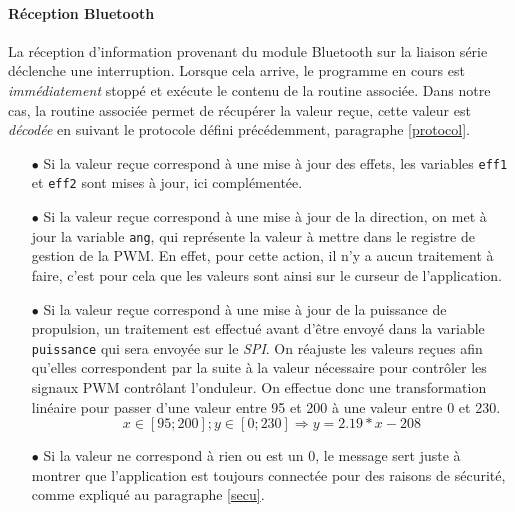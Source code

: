 			\paragraph{Réception Bluetooth} La réception d'information provenant du module Bluetooth sur la liaison série déclenche une interruption. Lorsque cela arrive, le programme en cours est \textit{immédiatement} stoppé et exécute le contenu de la routine associée. Dans notre cas, la routine associée permet de récupérer la valeur reçue, cette valeur est \textit{décodée} en suivant le protocole défini précédemment, paragraphe \ref{protocol}.
			\begin{itemize}
			\item[$\bullet$] Si la valeur reçue correspond à une mise à jour des effets, les variables \texttt{eff1} et \texttt{eff2} sont mises à jour, ici complémentée. 
			\item[$\bullet$] Si la valeur reçue correspond à une mise à jour de la direction, on met à jour la variable \texttt{ang}, qui représente la valeur à mettre dans le registre de gestion de la PWM. En effet, pour cette action, il n'y a aucun traitement à faire, c'est pour cela que les valeurs sont ainsi sur le curseur de l'application.
			\item[$\bullet$] Si la valeur reçue correspond à une mise à jour de la puissance de propulsion, un traitement est effectué avant d'être envoyé dans la variable \texttt{puissance} qui sera envoyée sur le \textit{SPI}. On réajuste les valeurs reçues afin qu'elles correspondent par la suite à la valeur nécessaire pour contrôler les signaux PWM contrôlant l'onduleur. On effectue donc une transformation linéaire pour passer d'une valeur entre 95 et 200 à une valeur entre 0 et 230.
			$$ x\in [95;200];y\in [0;230] \Rightarrow y=2.19*x-208 $$
			\label{picmain}
			\item[$\bullet$] Si la valeur ne correspond à rien ou est un 0, le message sert juste à montrer que l'application est toujours connectée pour des raisons de sécurité, comme expliqué au paragraphe \ref{secu}.		
			\end{itemize}			 
